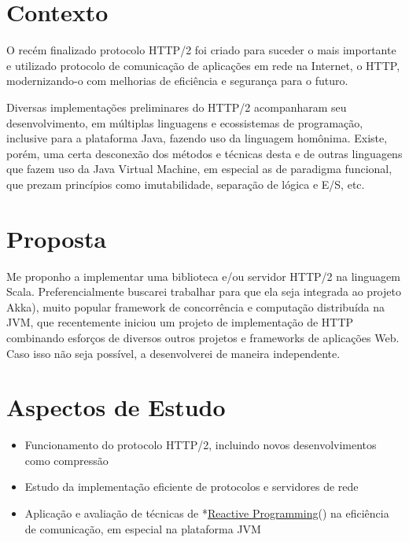 \documentclass[12pt,a4paper,openright,twoside,]{abntex2}	%
\begin{document}
\maketitle	%



{
\hypersetup{linkcolor=black}
\setcounter{tocdepth}{3}
\noindent\tableofcontents* %
\cleardoublepage
}

\textual	%
\section{Contexto}\label{contexto}

O recém finalizado protocolo HTTP/2 foi criado para suceder o mais
importante e utilizado protocolo de comunicação de aplicações em rede na
Internet, o HTTP, modernizando-o com melhorias de eficiência e segurança
para o futuro.

Diversas implementações preliminares do HTTP/2 acompanharam seu
desenvolvimento, em múltiplas linguagens e ecossistemas de programação,
inclusive para a plataforma Java, fazendo uso da linguagem homônima.
Existe, porém, uma certa desconexão dos métodos e técnicas desta e de
outras linguagens que fazem uso da Java Virtual Machine, em especial as
de paradigma funcional, que prezam princípios como imutabilidade,
separação de lógica e E/S, etc.

\section{Proposta}\label{proposta}

Me proponho a implementar uma biblioteca e/ou servidor HTTP/2 na
linguagem Scala. Preferencialmente buscarei trabalhar para que ela seja
integrada ao projeto Akka), muito popular framework de concorrência e
computação distribuída na JVM, que recentemente iniciou um projeto de
implementação de HTTP combinando esforços de diversos outros projetos e
frameworks de aplicações Web. Caso isso não seja possível, a
desenvolverei de maneira independente.

\section{Aspectos de Estudo}\label{aspectos-de-estudo}

\begin{itemize}
\tightlist
\item
  Funcionamento do protocolo HTTP/2, incluindo novos desenvolvimentos
  como compressão
\item
  Estudo da implementação eficiente de protocolos e servidores de rede
\item
  Aplicação e avaliação de técnicas de
  *\href{http://www.reactivemanifesto.org/}{Reactive Programming}() na
  eficiência de comunicação, em especial na plataforma JVM
\end{itemize}
\end{document}
